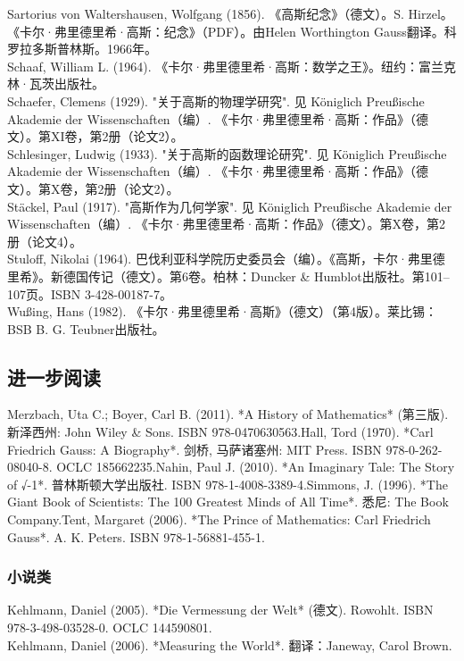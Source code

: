 Sartorius von Waltershausen, Wolfgang (1856). 《高斯纪念》（德文）。S. Hirzel。\\  
《卡尔·弗里德里希·高斯：纪念》（PDF）。由Helen Worthington Gauss翻译。科罗拉多斯普林斯。1966年。\\
Schaaf, William L. (1964). 《卡尔·弗里德里希·高斯：数学之王》。纽约：富兰克林·瓦茨出版社。\\  
Schaefer, Clemens (1929). "关于高斯的物理学研究". 见 Königlich Preußische Akademie der Wissenschaften（编）. 《卡尔·弗里德里希·高斯：作品》（德文）。第XI卷，第2册（论文2）。\\  
Schlesinger, Ludwig (1933). "关于高斯的函数理论研究". 见 Königlich Preußische Akademie der Wissenschaften（编）. 《卡尔·弗里德里希·高斯：作品》（德文）。第X卷，第2册（论文2）。\\  
Stäckel, Paul (1917). "高斯作为几何学家". 见 Königlich Preußische Akademie der Wissenschaften（编）. 《卡尔·弗里德里希·高斯：作品》（德文）。第X卷，第2册（论文4）。\\  
Stuloff, Nikolai (1964). 巴伐利亚科学院历史委员会（编）。《高斯，卡尔·弗里德里希》。新德国传记（德文）。第6卷。柏林：Duncker & Humblot出版社。第101–107页。ISBN 3-428-00187-7。\\  
Wußing, Hans (1982). 《卡尔·弗里德里希·高斯》（德文）（第4版）。莱比锡：BSB B. G. Teubner出版社。
\subsection{进一步阅读}
Merzbach, Uta C.; Boyer, Carl B. (2011). *A History of Mathematics* (第三版). 新泽西州: John Wiley & Sons. ISBN 978-0470630563.Hall, Tord (1970). *Carl Friedrich Gauss: A Biography*. 剑桥, 马萨诸塞州: MIT Press. ISBN 978-0-262-08040-8. OCLC 185662235.Nahin, Paul J. (2010). *An Imaginary Tale: The Story of √-1*. 普林斯顿大学出版社. ISBN 978-1-4008-3389-4.Simmons, J. (1996). *The Giant Book of Scientists: The 100 Greatest Minds of All Time*. 悉尼: The Book Company.Tent, Margaret (2006). *The Prince of Mathematics: Carl Friedrich Gauss*. A. K. Peters. ISBN 978-1-56881-455-1.
\subsubsection{小说类}
Kehlmann, Daniel (2005). *Die Vermessung der Welt* (德文). Rowohlt. ISBN 978-3-498-03528-0. OCLC 144590801.\\
Kehlmann, Daniel (2006). *Measuring the World*. 翻译：Janeway, Carol Brown.
